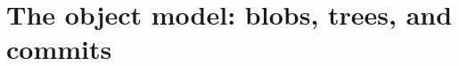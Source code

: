 \chapter{The object model: blobs, trees, and commits}
\label{ch:the-object-model-blobs-trees-and-commits}


